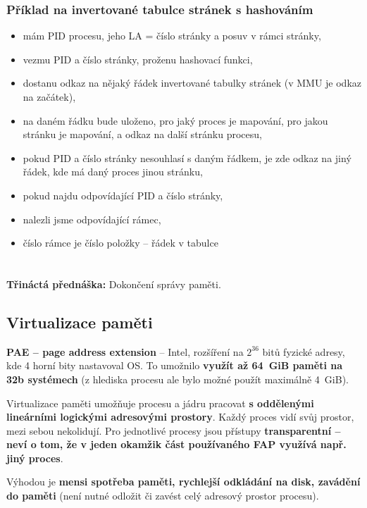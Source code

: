 \documentclass[a4paper, 11pt]{article}
\begin{document}
\subsubsection{Příklad na invertované tabulce stránek s hashováním}
\begin{itemize}
    \item mám PID procesu, jeho LA = číslo stránky a posuv v rámci stránky,
    \item vezmu PID a číslo stránky, proženu hashovací funkci,
    \item dostanu odkaz na nějaký řádek invertované tabulky stránek (v MMU je odkaz na začátek),
    \item na daném řádku bude uloženo, pro jaký proces je mapování, pro jakou stránku je mapování, a odkaz na další stránku procesu,
    \item pokud PID a číslo stránky nesouhlasí s daným řádkem, je zde odkaz na jiný řádek, kde má daný proces jinou stránku,
    \item pokud najdu odpovídající PID a číslo stránky,
    \item nalezli jsme odpovídající rámec,
    \item číslo rámce je číslo položky -- řádek v tabulce
\end{itemize}

\newpage

\section{}
\textbf{Třináctá přednáška:} Dokončení správy paměti.
\subsection{Virtualizace paměti}
\textbf{PAE -- page address extension} -- Intel, rozšíření na $2^{36}$ bitů fyzické adresy, kde 4 horní bity nastavoval OS. To umožnilo \textbf{využít až 64~GiB paměti na 32b systémech} (z hlediska procesu ale bylo možné použít maximálně 4~GiB).
 
Virtualizace paměti umožňuje procesu a jádru pracovat \textbf{s oddělenými lineárními logickými adresovými prostory}. Každý proces vidí svůj prostor, mezi sebou nekolidují. Pro jednotlivé procesy jsou přístupy \textbf{transparentní -- neví o tom, že v jeden okamžik část používaného FAP využívá např. jiný proces}.
 
Výhodou je \textbf{mensi spotřeba paměti, rychlejší odkládání na disk, zavádění do paměti} (není nutné odložit či zavést celý adresový prostor procesu).
 
\end{document}
